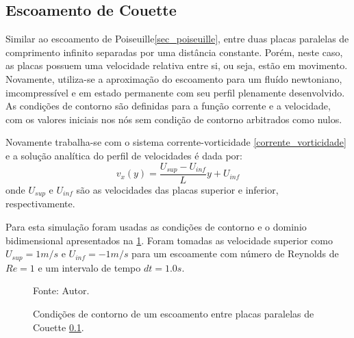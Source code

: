 \subsection{\textbf{Escoamento de Couette}}
\label{sec_couette}
Similar ao escoamento de Poiseuille\ref{sec_poiseuille}, entre duas placas paralelas de comprimento infinito separadas por uma distância constante.
Porém, neste caso, as placas possuem uma velocidade relativa entre si, ou seja, estão em movimento.
Novamente, utiliza-se a aproximação do escoamento para um fluído newtoniano, imcompressível e em estado permanente com seu perfil plenamente desenvolvido.
As condições de contorno são definidas para a função corrente e a velocidade, com os valores iniciais nos nós sem condição de contorno arbitrados como nulos.

Novamente trabalha-se com o sistema corrente-vorticidade \ref{corrente_vorticidade} e a solução analítica do perfil de velocidades é dada por\cite{pontes_norberto}:
\begin{equation}
    v_x(y) = \dfrac{U_{sup} - U_{inf}}{L}y + U_{inf}
    \label{couette_sol} 
\end{equation}
onde $U_{sup}$ e $U_{inf}$ são as velocidades das placas superior e inferior, respectivamente.

Para esta simulação foram usadas as condições de contorno e o dominio bidimensional apresentados na \ref{couette_bc}.
Foram tomadas as velocidade superior como $U_{sup}=1m/s$ e $U_{inf}=-1m/s$ para um escoamente com número de Reynolds de $Re=1$ e um intervalo de tempo $dt=1.0s$.
\begin{figure}[H]
    \centering
     {\raggedleft \scriptsize Fonte: Autor.}
    \caption{Condições de contorno de um escoamento entre placas paralelas de Couette \ref{sec_couette}.}
    \label{couette_bc}
\end{figure}

